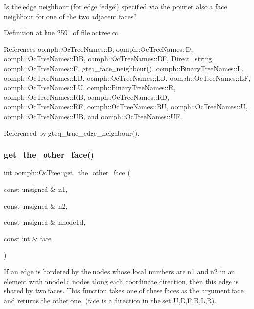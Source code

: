 Is the edge neighbour (for edge \char`\"{}edge\char`\"{}) specified via the pointer also a face neighbour for one of the two adjacent faces? 



Definition at line 2591 of file octree.\+cc.



References oomph\+::\+Oc\+Tree\+Names\+::B, oomph\+::\+Oc\+Tree\+Names\+::D, oomph\+::\+Oc\+Tree\+Names\+::\+DB, oomph\+::\+Oc\+Tree\+Names\+::\+DF, Direct\+\_\+string, oomph\+::\+Oc\+Tree\+Names\+::F, gteq\+\_\+face\+\_\+neighbour(), oomph\+::\+Binary\+Tree\+Names\+::L, oomph\+::\+Oc\+Tree\+Names\+::\+LB, oomph\+::\+Oc\+Tree\+Names\+::\+LD, oomph\+::\+Oc\+Tree\+Names\+::\+LF, oomph\+::\+Oc\+Tree\+Names\+::\+LU, oomph\+::\+Binary\+Tree\+Names\+::R, oomph\+::\+Oc\+Tree\+Names\+::\+RB, oomph\+::\+Oc\+Tree\+Names\+::\+RD, oomph\+::\+Oc\+Tree\+Names\+::\+RF, oomph\+::\+Oc\+Tree\+Names\+::\+RU, oomph\+::\+Oc\+Tree\+Names\+::U, oomph\+::\+Oc\+Tree\+Names\+::\+UB, and oomph\+::\+Oc\+Tree\+Names\+::\+UF.



Referenced by gteq\+\_\+true\+\_\+edge\+\_\+neighbour().

\mbox{\label{classoomph_1_1OcTree_ab03edae455d5bd788acf426ca3f87b9d}} 
\subsubsection{\texorpdfstring{get\+\_\+the\+\_\+other\+\_\+face()}{get\_the\_other\_face()}}
{\footnotesize\ttfamily int oomph\+::\+Oc\+Tree\+::get\+\_\+the\+\_\+other\+\_\+face (\begin{DoxyParamCaption}\item[{const unsigned \&}]{n1,  }\item[{const unsigned \&}]{n2,  }\item[{const unsigned \&}]{nnode1d,  }\item[{const int \&}]{face }\end{DoxyParamCaption})\hspace{0.3cm}{\ttfamily [static]}}



If an edge is bordered by the nodes whose local numbers are n1 and n2 in an element with nnode1d nodes along each coordinate direction, then this edge is shared by two faces. This function takes one of these faces as the argument {\ttfamily face} and returns the other one. ({\ttfamily face} is a direction in the set U,D,F,B,L,R). 

